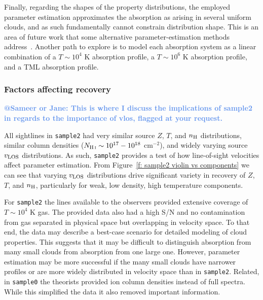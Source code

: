 \documentclass[fleqn,usenatbib]{mnras}
\makeatletter
\newcommand{\atsameer}[1]{\textcolor{CornflowerBlue}{\textbf{@Sameer or Jane: #1}}}
\makeatother
\begin{document}
Finally, regarding the shapes of the property distributions,
the employed parameter estimation approximates the absorption as arising in several uniform clouds,
and as such fundamentally cannot constrain distribution shape.
This is an area of future work that some alternative parameter-estimation methods address~\citep[such as fitting the underlying density distribution as a power law;][]{stern2016Universal}.
Another path to explore is to model each absorption system as a linear combination of a $T \sim 10^4$ K absorption profile, a $T \sim 10^6$ K absorption profile, and a TML absorption profile.

\subsubsection{Factors affecting recovery}
\label{s: discussion -- cloud structure -- factors}

\atsameer{This is where I discuss the implications of sample2 in regards to the importance of vlos, flagged at your request.}

All sightlines in \texttt{sample2} had very similar source $Z$, $T$, and $n_{\rm H}$ distributions,
similar column densities ($N_{\ion{H}{I}} \sim 10^{17}-10^{18}$ cm$^{-2}$),
and widely varying source $v_{\rm LOS}$ distributions. 
As such, \texttt{sample2} provides a test of how line-of-sight velocities affect parameter estimation.
From Figure~\ref{f: sample2 violin vs components} we can see that varying $v_{\rm LOS}$ distributions drive significant variety in recovery of $Z$, $T$, and $n_{\rm H}$, particularly for weak, low density, high temperature components.

For \texttt{sample2} the lines available to the observers provided extensive coverage of $T \sim 10^4$ K gas.
The provided data also had a high S/N and no contamination from gas separated in physical space but overlapping in velocity space.
To that end, the data may describe a best-case scenario for detailed modeling of cloud properties.
This suggests that it may be difficult to distinguish absorption from many small clouds from absorption from one large one.
However, parameter estimation may be more successful if the many small clouds have narrower profiles or are more widely distributed in velocity space than in \texttt{sample2}.
Related, in \texttt{sample0} the theorists provided ion column densities instead of full spectra.
While this simplified the data it also removed important information.
\end{document}
